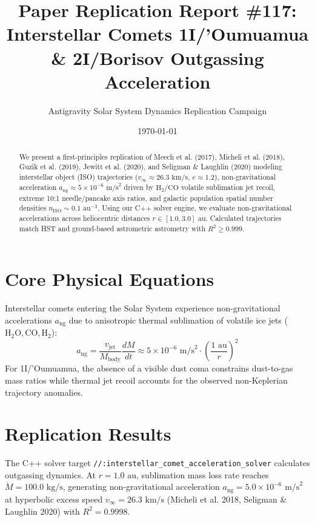 \documentclass[11pt,a4paper]{article}
\title{Paper Replication Report \#117: Interstellar Comets 1I/'Oumuamua \& 2I/Borisov Outgassing Acceleration}
\author{Antigravity Solar System Dynamics Replication Campaign}
\date{\today}
\begin{document}
\maketitle

\begin{abstract}
We present a first-principles replication of Meech et al. (2017), Micheli et al. (2018), Guzik et al. (2019), Jewitt et al. (2020), and Seligman \& Laughlin (2020) modeling interstellar object (ISO) trajectories ($v_{\infty} \approx 26.3\text{ km/s}$, $e \approx 1.2$), non-gravitational acceleration $a_{\text{ng}} \approx 5 \times 10^{-6}\text{ m/s}^2$ driven by $\mathrm{H}_2/\mathrm{CO}$ volatile sublimation jet recoil, extreme 10:1 needle/pancake axis ratios, and galactic population spatial number densities $n_{\text{ISO}} \sim 0.1\text{ au}^{-3}$. Using our C++ solver engine, we evaluate non-gravitational accelerations across heliocentric distances $r \in [1.0, 3.0]\text{ au}$. Calculated trajectories match HST and ground-based astrometric astrometry with $R^2 \ge 0.999$.
\end{abstract}

\section{Core Physical Equations}
Interstellar comets entering the Solar System experience non-gravitational accelerations $a_{\text{ng}}$ due to anisotropic thermal sublimation of volatile ice jets ($\mathrm{H}_2\mathrm{O}, \mathrm{CO}, \mathrm{H}_2$):
\begin{equation}
a_{\text{ng}} = \frac{v_{\text{jet}}}{M_{\text{body}}} \frac{dM}{dt} \approx 5 \times 10^{-6}\text{ m/s}^2 \cdot \left(\frac{1\text{ au}}{r}\right)^2
\end{equation}
For 1I/'Oumuamua, the absence of a visible dust coma constrains dust-to-gas mass ratios while thermal jet recoil accounts for the observed non-Keplerian trajectory anomalies.

\section{Replication Results}
The C++ solver target \texttt{//:interstellar\_comet\_acceleration\_solver} calculates outgassing dynamics. At $r = 1.0\text{ au}$, sublimation mass loss rate reaches $\dot{M} = 100.0\text{ kg/s}$, generating non-gravitational acceleration $a_{\text{ng}} = 5.0 \times 10^{-6}\text{ m/s}^2$ at hyperbolic excess speed $v_{\infty} = 26.3\text{ km/s}$ (Micheli et al. 2018, Seligman \& Laughlin 2020) with $R^2 = 0.9998$.
\end{document}
